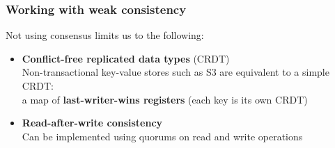 \documentclass[aspectratio=169,xcolor={svgnames}]{beamer}
\begin{document}
\begin{frame}
	\frametitle{Working with weak consistency}
	Not using consensus limits us to the following:
	\vspace{2em}
	\begin{itemize}
		\item<2-> \textbf{Conflict-free replicated data types} (CRDT)\\
			\vspace{1em}
			{\footnotesize Non-transactional key-value stores such as S3 are equivalent to a simple CRDT:\\
			a map of \textbf{last-writer-wins registers} (each key is its own CRDT)}
			\vspace{1.5em}
		\item<3-> \textbf{Read-after-write consistency}\\
			\vspace{1em}
			{\footnotesize Can be implemented using quorums on read and write operations}
	\end{itemize}
\end{frame}
\end{document}
